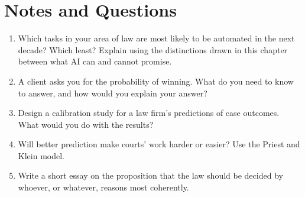 \section*{Notes and Questions}
\begin{enumerate}[label=\arabic*.]
\item Which tasks in your area of law are most likely to be automated in the next decade? Which least? Explain using the distinctions drawn in this chapter between what AI can and cannot promise.
\item A client asks you for the probability of winning. What do you need to know to answer, and how would you explain your answer?
\item Design a calibration study for a law firm's predictions of case outcomes. What would you do with the results?
\item Will better prediction make courts' work harder or easier? Use the Priest and Klein model.
\item Write a short essay on the proposition that the law should be decided by whoever, or whatever, reasons most coherently.
\end{enumerate}
